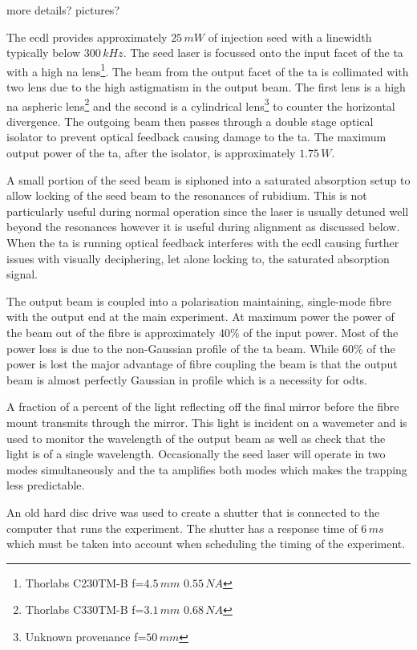 {\color{red} more details? pictures?}

The \gls{ecdl} provides approximately $25\,\unit{mW}$ of injection seed with a linewidth typically below $300\,\unit{kHz}$. The seed laser is focussed onto the input facet of the \gls{ta} with a high \gls{na} lens\footnote{Thorlabs C230TM-B f=$4.5\,\unit{mm}$ $0.55\,\unit{NA}$}. The beam from the output facet of the \gls{ta} is collimated with two lens due to the high astigmatism in the output beam. The first lens is a high \gls{na} aspheric lens\footnote{Thorlabs C330TM-B f=$3.1\,\unit{mm}$ $0.68\,\unit{NA}$} and the second is a cylindrical lens\footnote{Unknown provenance f=$50\,\unit{mm}$} to counter the horizontal divergence. The outgoing beam then passes through a double stage optical isolator to prevent optical feedback causing damage to the \gls{ta}. The maximum output power of the \gls{ta}, after the isolator, is approximately $1.75\,\unit{W}$.

A small portion of the seed beam is siphoned into a saturated absorption setup\cite{maguire_theoretical_2006, haroche_theory_1972, preston_doppler-free_1996} to allow locking of the seed beam to the resonances of rubidium. This is not particularly useful during normal operation since the laser is usually detuned well beyond the resonances however it is useful during alignment as discussed below. When the \gls{ta} is running optical feedback interferes with the \gls{ecdl} causing further issues with visually deciphering, let alone locking to, the saturated absorption signal.

The output beam is coupled into a polarisation maintaining, single-mode fibre with the output end at the main experiment. At maximum power the power of the beam out of the fibre is approximately 40\% of the input power. Most of the power loss is due to the non-Gaussian profile of the \gls{ta} beam. While 60\% of the power is lost the major advantage of fibre coupling the beam is that the output beam is almost perfectly Gaussian in profile which is a necessity for \glspl{odt}.

A fraction of a percent of the light reflecting off the final mirror before the fibre mount transmits through the mirror. This light is incident on a wavemeter and is used to monitor the wavelength of the output beam as well as check that the light is of a single wavelength. Occasionally the seed laser will operate in two modes simultaneously and the \gls{ta} amplifies both modes which makes the trapping less predictable.

An old hard disc drive was used to create a shutter\cite{scholten_enhanced_2007} that is connected to the computer that runs the experiment. The shutter has a response time of $6\,\unit{ms}$ which must be taken into account when scheduling the timing of the experiment.

